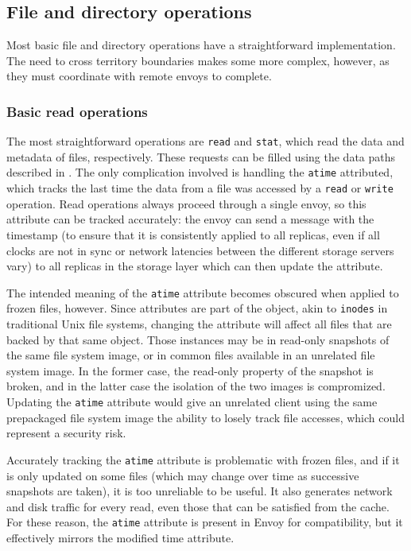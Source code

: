 \subsection{File and directory operations}

Most basic file and directory operations have a straightforward implementation. The need to cross territory boundaries makes some more complex, however, as they must coordinate with remote envoys to complete.

\subsubsection{Basic read operations}

The most straightforward operations are \texttt{read} and \texttt{stat}, which read the data and metadata of files, respectively. These requests can be filled using the data paths described in . The only complication involved is handling the \texttt{atime} attributed, which tracks the last time the data from a file was accessed by a \texttt{read} or \texttt{write} operation. Read operations always proceed through a single envoy, so this attribute can be tracked accurately: the envoy can send a message with the timestamp (to ensure that it is consistently applied to all replicas, even if all clocks are not in sync or network latencies between the different storage servers vary) to all replicas in the storage layer which can then update the attribute.

The intended meaning of the \texttt{atime} attribute becomes obscured when applied to frozen files, however. Since attributes are part of the object, akin to \texttt{inodes} in traditional Unix file systems, changing the attribute will affect all files that are backed by that same object. Those instances may be in read-only snapshots of the same file system image, or in common files available in an unrelated file system image. In the former case, the read-only property of the snapshot is broken, and in the latter case the isolation of the two images is compromized. Updating the \texttt{atime} attribute would give an unrelated client using the same prepackaged file system image the ability to losely track file accesses, which could represent a security risk.

Accurately tracking the \texttt{atime} attribute is problematic with frozen files, and if it is only updated on some files (which may change over time as successive snapshots are taken), it is too unreliable to be useful. It also generates network and disk traffic for every read, even those that can be satisfied from the cache. For these reason, the \texttt{atime} attribute is present in Envoy for compatibility, but it effectively mirrors the modified time attribute.

